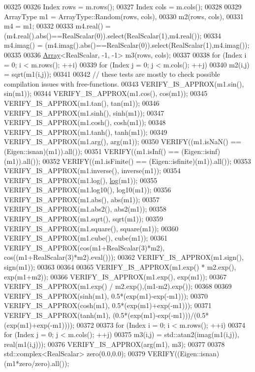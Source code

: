 \begin{DoxyCode}
00325 
00326   Index rows = m.rows();
00327   Index cols = m.cols();
00328 
00329   ArrayType m1 = ArrayType::Random(rows, cols),
00330             m2(rows, cols),
00331             m4 = m1;
00332   
00333   m4.real() = (m4.real().abs()==RealScalar(0)).select(RealScalar(1),m4.real());
00334   m4.imag() = (m4.imag().abs()==RealScalar(0)).select(RealScalar(1),m4.imag());
00335 
00336   \hyperlink{group___core___module_class_eigen_1_1_array}{Array}<RealScalar, -1, -1> m3(rows, cols);
00337 
00338   \textcolor{keywordflow}{for} (Index i = 0; i < m.rows(); ++i)
00339     \textcolor{keywordflow}{for} (Index j = 0; j < m.cols(); ++j)
00340       m2(i,j) = sqrt(m1(i,j));
00341 
00342   \textcolor{comment}{// these tests are mostly to check possible compilation issues with free-functions.}
00343   VERIFY\_IS\_APPROX(m1.sin(), sin(m1));
00344   VERIFY\_IS\_APPROX(m1.cos(), cos(m1));
00345   VERIFY\_IS\_APPROX(m1.tan(), tan(m1));
00346   VERIFY\_IS\_APPROX(m1.sinh(), sinh(m1));
00347   VERIFY\_IS\_APPROX(m1.cosh(), cosh(m1));
00348   VERIFY\_IS\_APPROX(m1.tanh(), tanh(m1));
00349   VERIFY\_IS\_APPROX(m1.arg(), arg(m1));
00350   VERIFY((m1.isNaN() == (Eigen::isnan)(m1)).all());
00351   VERIFY((m1.isInf() == (Eigen::isinf)(m1)).all());
00352   VERIFY((m1.isFinite() == (Eigen::isfinite)(m1)).all());
00353   VERIFY\_IS\_APPROX(m1.inverse(), inverse(m1));
00354   VERIFY\_IS\_APPROX(m1.log(), \hyperlink{structlog}{log}(m1));
00355   VERIFY\_IS\_APPROX(m1.log10(), log10(m1));
00356   VERIFY\_IS\_APPROX(m1.abs(), abs(m1));
00357   VERIFY\_IS\_APPROX(m1.abs2(), abs2(m1));
00358   VERIFY\_IS\_APPROX(m1.sqrt(), sqrt(m1));
00359   VERIFY\_IS\_APPROX(m1.square(), square(m1));
00360   VERIFY\_IS\_APPROX(m1.cube(), cube(m1));
00361   VERIFY\_IS\_APPROX(cos(m1+RealScalar(3)*m2), cos((m1+RealScalar(3)*m2).eval()));
00362   VERIFY\_IS\_APPROX(m1.sign(), sign(m1));
00363 
00364 
00365   VERIFY\_IS\_APPROX(m1.exp() * m2.exp(), exp(m1+m2));
00366   VERIFY\_IS\_APPROX(m1.exp(), exp(m1));
00367   VERIFY\_IS\_APPROX(m1.exp() / m2.exp(),(m1-m2).exp());
00368 
00369   VERIFY\_IS\_APPROX(sinh(m1), 0.5*(exp(m1)-exp(-m1)));
00370   VERIFY\_IS\_APPROX(cosh(m1), 0.5*(exp(m1)+exp(-m1)));
00371   VERIFY\_IS\_APPROX(tanh(m1), (0.5*(exp(m1)-exp(-m1)))/(0.5*(exp(m1)+exp(-m1))));
00372 
00373   \textcolor{keywordflow}{for} (Index i = 0; i < m.rows(); ++i)
00374     \textcolor{keywordflow}{for} (Index j = 0; j < m.cols(); ++j)
00375       m3(i,j) = std::atan2(imag(m1(i,j)), real(m1(i,j)));
00376   VERIFY\_IS\_APPROX(arg(m1), m3);
00377 
00378   std::complex<RealScalar> zero(0.0,0.0);
00379   VERIFY((Eigen::isnan)(m1*zero/zero).all());

\end{DoxyCode}
